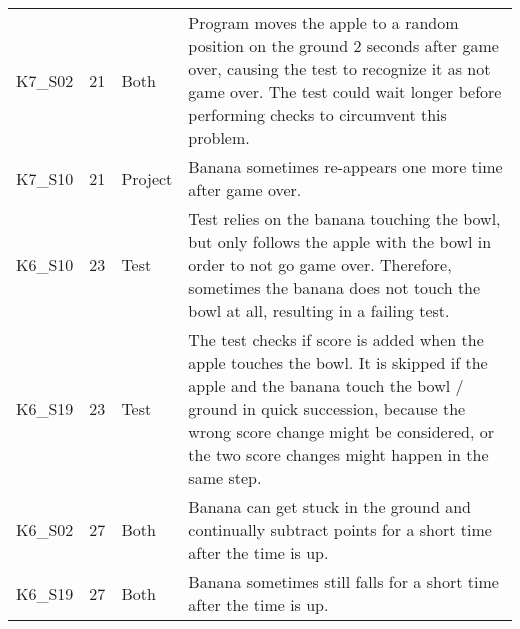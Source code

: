 \begin{table}[htpb]
{\begin{tabular}{lrlp{11.25cm}}
        K7\_S02 & 21   & Both    & Program moves the apple to a random position on the ground 2 seconds after game over, causing the test to recognize it as not game over.
                                   The test could wait longer before performing checks to circumvent this problem. \\
        K7\_S10 & 21   & Project & Banana sometimes re-appears one more time after game over. \\
        K6\_S10 & 23   & Test    & Test relies on the banana touching the bowl, but only follows the apple with the bowl in order to not go game over.
                                   Therefore, sometimes the banana does not touch the bowl at all, resulting in a failing test. \\
        K6\_S19 & 23   & Test    & The test checks if score is added when the apple touches the bowl.
                                   It is skipped if the apple and the banana touch the bowl / ground in quick succession,
                                   because the wrong score change might be considered, or the two score changes might happen in the same step. \\

        K6\_S02 & 27   & Both    & Banana can get stuck in the ground and continually subtract points for a short time after the time is up. \\
        K6\_S19 & 27   & Both    & Banana sometimes still falls for a short time after the time is up. \\
        \bottomrule
    \end{tabular}
    }

    \medskip


\end{table}
